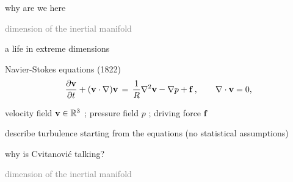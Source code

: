 \begin{frame}{}
\begin{enumerate}
              \item {\Large
why are we here
                  }\textcolor{gray}{\small
              \item
\statesp
             \item
dimension of the inertial manifold
                    }
            \end{enumerate}
\end{frame}



\begin{frame}{a life in extreme dimensions}
\begin{block}{Navier-Stokes equations (1822)}
\[
\dfrac{\partial {\bf v}}{\partial t} + ({\bf v} \cdot \nabla) {\bf v}
	\,=\,
\frac{1}{R} \nabla ^2 {\bf v}
-\nabla p
+ \mathbf{f}
    \,,\qquad
\nabla \cdot {\bf v} = 0,
\]
\end{block}

\hfill{\small
velocity field  ${\bf v} \in \mathbb{R}^3$
;
pressure field $p$
;
driving force $\mathbf{f}$
        }

\medskip

\begin{block}{describe turbulence}
starting from the equations
{\color{red} (no statistical assumptions)}
\end{block}

\bigskip

\end{frame}

\begin{frame}{}
\begin{enumerate}
              \item {\Large
why is Cvitanovi\'c talking?
                  }\textcolor{gray}{\small
              \item
\statesp
             \item
dimension of the inertial manifold
                    }
            \end{enumerate}
\end{frame}

